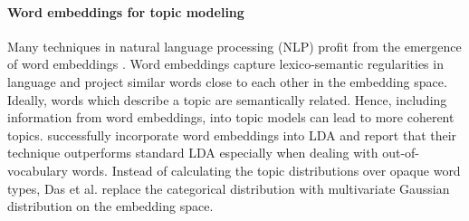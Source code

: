 \paragraph{Word embeddings for topic modeling} Many techniques in natural language processing (NLP) profit from the emergence of word embeddings \citep{mikolovdistributed2013,bengioneural2003}. Word embeddings capture lexico-semantic regularities in language and project similar words close to each other in the embedding space. Ideally, words which describe a topic are semantically related. Hence, including information from word embeddings, into topic models can lead to more coherent topics. \citet{dasgaussian2015} successfully incorporate word embeddings into LDA and report that their technique outperforms standard LDA especially when dealing with out-of-vocabulary words. Instead of calculating the topic distributions over opaque word types, Das et al. replace the categorical distribution with multivariate Gaussian distribution on the embedding space.

